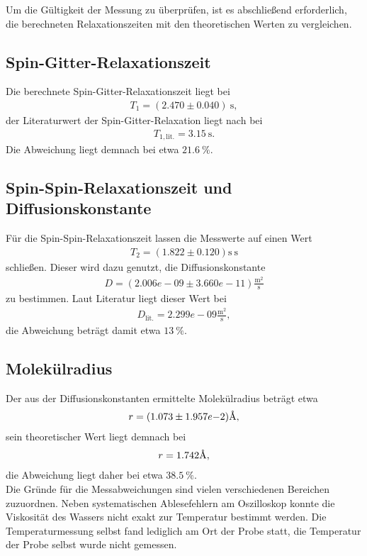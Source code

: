 \noindent Um die Gültigkeit der Messung zu überprüfen, ist es abschließend
erforderlich, die berechneten Relaxationszeiten mit den theoretischen Werten
zu vergleichen.
\subsection{Spin-Gitter-Relaxationszeit}
Die berechnete Spin-Gitter-Relaxationszeit liegt bei
\begin{align*}
  T_1 =  (2.470  \pm  0.040) \: \si{\second},
\end{align*}
\noindent der Literaturwert der Spin-Gitter-Relaxation liegt nach
\cite{temperatur_t1} bei
\begin{align*}
  T_{1,\text{lit.}} = 3.15 \: \si{\second}.
\end{align*}
\noindent Die Abweichung liegt demnach bei etwa $\SI{21.6}{\percent}$.
\subsection{Spin-Spin-Relaxationszeit und Diffusionskonstante}
\noindent Für die Spin-Spin-Relaxationszeit lassen die Messwerte auf einen Wert
\begin{align*}
  T_2 =  (1.822  \pm  0.120) \si{\second} \: \si{\second}
\end{align*}
\noindent schließen. Dieser wird dazu genutzt, die Diffusionskonstante
\begin{align*}
  D =  (2.006e-09 \pm 3.660e-11) \frac{\si{\meter^2}}{\si{\second}}
\end{align*}
\noindent zu bestimmen. Laut Literatur \cite{diffusion} liegt dieser Wert bei
\begin{align*}
  D_\text{lit.} =  2.299e-09  \frac{\si{\meter^2}}{\si{\second}},
\end{align*}
\noindent die Abweichung beträgt damit etwa $\SI{13}{\percent}$.
\subsection{Molekülradius}
Der aus der Diffusionskonstanten ermittelte Molekülradius beträgt etwa
\begin{align*}
 r = (1.073\pm 1.957e{-2}) \text{\r{A}},
\end{align*}
\noindent sein theoretischer Wert liegt demnach bei
\begin{align*}
 r = 1.742 \text{\r{A}},
\end{align*}
\noindent die Abweichung liegt daher bei etwa $\SI{38.5}{\percent}$. \\
\noindent Die Gründe für die Messabweichungen sind vielen verschiedenen
Bereichen zuzuordnen. Neben systematischen Ablesefehlern am Oszilloskop konnte
die Viskosität des Wassers nicht exakt zur Temperatur bestimmt werden. Die
Temperaturmessung selbst fand lediglich am Ort der Probe statt, die Temperatur
der Probe selbst wurde nicht gemessen.
